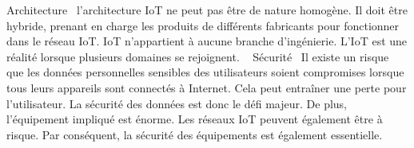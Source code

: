 Architecture \newline l’architecture IoT ne peut pas être de nature homogène. Il doit être hybride, prenant en charge les produits de différents fabricants pour fonctionner dans le réseau IoT. IoT n’appartient à aucune branche d’ingénierie. L’IoT est une réalité lorsque plusieurs domaines se rejoignent.\newline  
Sécurité \newline Il existe un risque que les données personnelles sensibles des utilisateurs soient compromises lorsque tous leurs appareils sont connectés à Internet. Cela peut entraîner une perte pour l’utilisateur. La sécurité des données est donc le défi majeur. De plus, l’équipement impliqué est énorme. Les réseaux IoT peuvent également être à risque. Par conséquent, la sécurité des équipements est également essentielle.